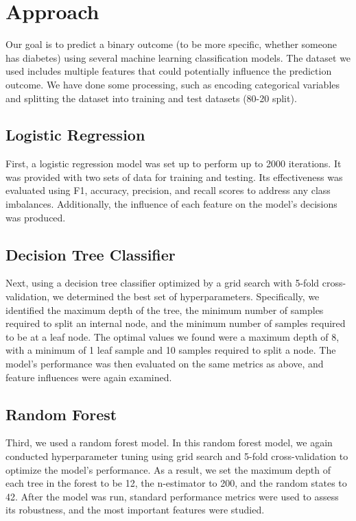 \documentclass[]{article}
\begin{document}
\section{Approach}
Our goal is to predict a binary outcome (to be more specific, whether someone has diabetes) using several machine learning classification models. The dataset we used includes multiple features that could potentially influence the prediction outcome. We have done some processing, such as  encoding categorical variables and splitting the dataset into training and test datasets (80-20 split).

\subsection{Logistic Regression}
First, a logistic regression model was set up to perform up to 2000 iterations. It was provided with two sets of data for training and testing. Its effectiveness was evaluated using F1, accuracy, precision, and recall scores to address any class imbalances. Additionally, the influence of each feature on the model’s decisions was produced.

\subsection{Decision Tree Classifier}
Next, using a decision tree classifier optimized by a grid search with 5-fold cross-validation, we determined the best set of hyperparameters. Specifically, we identified the maximum depth of the tree, the minimum number of samples required to split an internal node, and the minimum number of samples required to be at a leaf node. The optimal values we found were a maximum depth of 8, with a minimum of 1 leaf sample and 10 samples required to split a node. The model's performance was then evaluated on the same metrics as above, and feature influences were again examined.

\subsection{Random Forest}
Third, we used a random forest model. In this random forest model, we again conducted hyperparameter tuning using grid search and 5-fold cross-validation to optimize the model's performance. As a result, we set the maximum depth of each tree in the forest to be 12, the n-estimator to 200, and the random states to 42. After the model was run, standard performance metrics were used to assess its robustness, and the most important features were studied.
\end{document}

